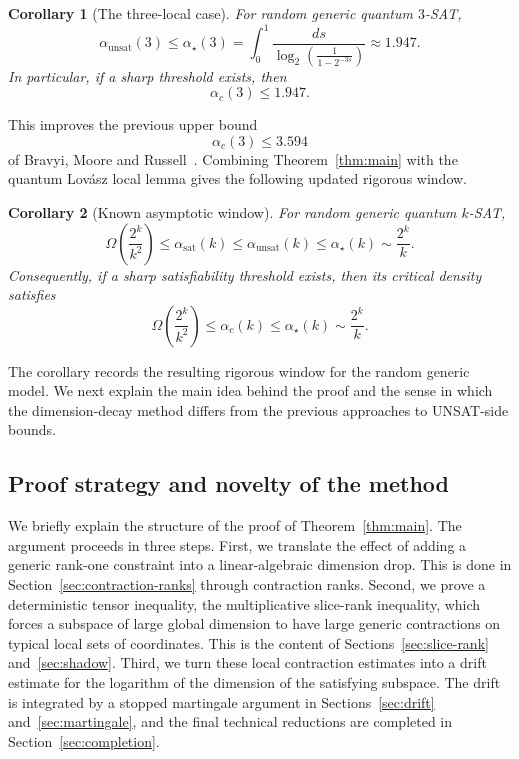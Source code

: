\documentclass[11pt]{article}
\newtheorem{corollary}{Corollary}
\begin{document}
\begin{corollary}[The three-local case]
	\label{cor:three-local}
	For random generic quantum \(3\)-SAT,
	\[
	\alpha_{\mathrm{unsat}}(3)
	\leq
	\alpha_\star(3)
	=
	\int_0^1
	\frac{ds}{
		\log_2\left(\frac{1}{1-2^{-3s}}\right)
	}
	\approx 1.947 .
	\]
	In particular, if a sharp threshold exists, then
	\[
	\alpha_c(3)
	\leq
	1.947 .
	\]
\end{corollary}
This improves the previous upper bound
\[
\alpha_c(3)\leq 3.594
\]
of Bravyi, Moore and Russell~\cite{BMR}.
Combining Theorem~\ref{thm:main} with the quantum Lov\'asz local lemma gives
the following updated rigorous window.

\begin{corollary}[Known asymptotic window]
	\label{cor:window}
	For random generic quantum \(k\)-SAT,
	\[
	\Omega\!\left(\frac{2^k}{k^2}\right)
	\leq
	\alpha_{\mathrm{sat}}(k)
	\leq
	\alpha_{\mathrm{unsat}}(k)
	\leq
	\alpha_\star(k)
	\sim
	\frac{2^k}{k}.
	\]
	Consequently, if a sharp satisfiability threshold exists, then its critical
	density satisfies
	\[
	\Omega\!\left(\frac{2^k}{k^2}\right)
	\leq
	\alpha_c(k)
	\leq
	\alpha_\star(k)
	\sim
	\frac{2^k}{k}.
	\]
\end{corollary}
The corollary records the resulting rigorous window for the random generic
model.  We next explain the main idea behind the proof and the sense
in which the dimension-decay method differs from the previous approaches to
UNSAT-side bounds.

\subsection{Proof strategy and novelty of the method}
\label{subsec:discussion}

We briefly explain the structure of the proof of Theorem~\ref{thm:main}.  The
argument proceeds in three steps.  First, we translate the effect of adding a
generic rank-one constraint into a linear-algebraic dimension drop.  This is
done in Section~\ref{sec:contraction-ranks} through contraction ranks.  Second,
we prove a deterministic tensor inequality, the multiplicative slice-rank
inequality, which forces a subspace of large global dimension to have large
generic contractions on typical local sets of coordinates.  This is the content
of Sections~\ref{sec:slice-rank} and~\ref{sec:shadow}.  Third, we turn these
local contraction estimates into a drift estimate for the logarithm of the
dimension of the satisfying subspace.  The drift is integrated by a stopped
martingale argument in Sections~\ref{sec:drift} and~\ref{sec:martingale},
and the final technical reductions are completed in
Section~\ref{sec:completion}.
\end{document}
